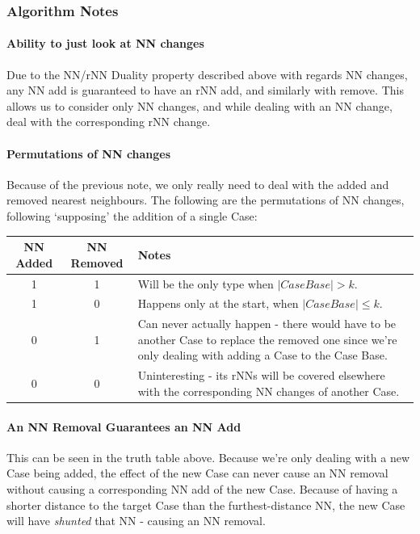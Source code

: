 \documentclass[a4paper,11pt]{report}
\begin{document}
\subsubsection{Algorithm Notes}
\paragraph{Ability to just look at NN changes}
Due to the NN/rNN Duality property described above with regards NN changes, any NN add is guaranteed to have an rNN add, and similarly with remove. This allows us to consider only NN changes, and while dealing with an NN change, deal with the corresponding rNN change.

\begin{samepage}
\paragraph{Permutations of NN changes}
Because of the previous note, we only really need to deal with the added and removed nearest neighbours. The following are the permutations of NN changes, following `supposing' the addition of a single Case:

\vspace{10pt}

\begin{tabular}{ | c | c | p{280pt} |} \hline
	NN Added & NN Removed & Notes \\ \hline
	1 & 1 & Will be the only type when $\left|CaseBase\right|> k$. \\ \hline
	1 & 0 & Happens only at the start, when $\left|CaseBase\right|\leq k$. \\ \hline
	0 & 1 & Can never actually happen - there would have to be another Case to replace the removed one since we're only dealing with adding a Case to the Case Base. \\ \hline
	0 & 0 & Uninteresting - its rNNs will be covered elsewhere with the corresponding NN changes of another Case. \\ \hline
\end{tabular}

\end{samepage}

\paragraph{An NN Removal Guarantees an NN Add}
This can be seen in the truth table above. Because we're only dealing with a new Case being added, the effect of the new Case can never cause an NN removal without causing a corresponding NN add of the new Case. Because of having a shorter distance to the target Case than the furthest-distance NN, the new Case will have \emph{shunted} that NN - causing an NN removal.
\end{document}
